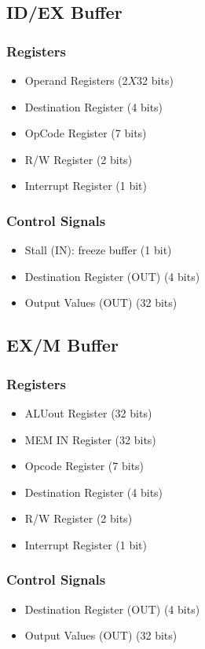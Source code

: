 \subsection{ID/EX Buffer}
\subsubsection{Registers}
\begin{itemize}
    \item Operand Registers (2$X$32 bits)
    \item Destination Register (4 bits)
    \item OpCode Register (7 bits)
    \item R/W Register (2 bits)
    \item Interrupt Register (1 bit)
\end{itemize}

\subsubsection{Control Signals}
\begin{itemize}
    \item Stall (IN): freeze buffer (1 bit)
    \item Destination Register (OUT) (4 bits)
    \item Output Values (OUT) (32 bits)
\end{itemize}

\subsection{EX/M Buffer}
\subsubsection{Registers}
\begin{itemize}
    \item ALUout Register (32 bits)
    \item MEM IN Register (32 bits)
    \item Opcode Register (7 bits)
    \item Destination Register (4 bits)
    \item R/W Register (2 bits)
    \item Interrupt Register (1 bit)
\end{itemize}

\subsubsection{Control Signals}
\begin{itemize}
    \item Destination Register (OUT) (4 bits)
    \item Output Values (OUT) (32 bits)
\end{itemize}


